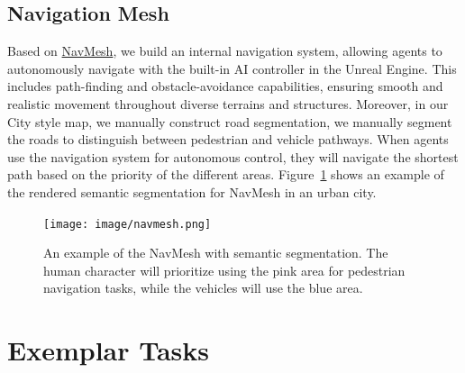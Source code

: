 \subsection{Navigation Mesh}
 Based on \href{https://dev.epicgames.com/documentation/en-us/unreal-engine/world-partitioned-navigation-mesh?application_version=5.4}{NavMesh}, we build an internal navigation system, allowing agents to autonomously navigate with the built-in AI controller in the Unreal Engine. This includes path-finding and obstacle-avoidance capabilities, ensuring smooth and realistic movement throughout diverse terrains and structures. Moreover, in our City style map, we manually construct road segmentation, we manually segment the roads to distinguish between pedestrian and vehicle pathways. When agents use the navigation system for autonomous control, they will navigate the shortest path based on the priority of the different areas. Figure~\ref{fig:nav_mesh} shows an example of the rendered semantic segmentation for NavMesh in an urban city.
 
\begin{figure}[t]
    \centering
    \texttt{[image: image/navmesh.png]}
    \caption{An example of the NavMesh with semantic segmentation. The human character will prioritize using the pink area for pedestrian navigation tasks, while the vehicles will use the blue area.}
    \label{fig:nav_mesh}
\end{figure}



\section{Exemplar Tasks}

